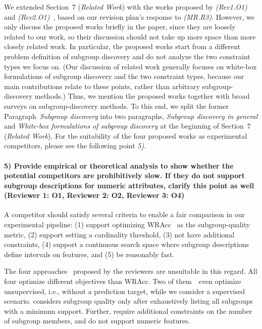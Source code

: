 \documentclass{article}
\begin{document}
We extended Section~7 (\emph{Related Work}) with the works proposed by \emph{(Rev1.O1)}~\cite{lawless2022interpretable, pastor2021looking} and \emph{(Rev2.O1)}~\cite{asudeh2019assessing, sagadeeva2021sliceline}, based on our revision plan's response to \emph{(MR.R3)}.
However, we only discuss the proposed works briefly in the paper, since they are loosely related to our work, so their discussion should not take up more space than more closely related work.
In particular, the proposed works start from a different problem definition of subgroup discovery and do not analyze the two constraint types we focus on.
(Our discussion of related work generally focuses on white-box formulations of subgroup discovery and the two constraint types, because our main contributions relate to these points, rather than arbitrary subgroup-discovery methods.)
Thus, we mention the proposed works together with broad surveys on subgroup-discovery methods.
To this end, we split the former Paragraph~\emph{Subgroup discovery} into two paragraphs, \emph{Subgroup discovery in general} and \emph{White-box formulations of subgroup discovery} at the beginning of Section~7 (\emph{Related Work}).
For the suitability of the four proposed works as experimental competitors, please see the following point \emph{5)}.

\pagebreak

\paragraph{5) Provide empirical or theoretical analysis to show whether the potential competitors are prohibitively slow. If they do not support subgroup descriptions for numeric attributes, clarify this point as well (Reviewer 1: O1, Reviewer 2: O2, Reviewer 3: O4)}

A competitor should satisfy several criteria to enable a fair comparison in our experimental pipeline:
(1) support optimizing WRAcc~\cite{lavravc1999rule} as the subgroup-quality metric,
(2) support setting a cardinality threshold,
(3) not have additional constraints,
(4) support a continuous search space where subgroup descriptions define intervals on features, and
(5) be reasonably fast.

The four approaches~\cite{asudeh2019assessing, lawless2022interpretable, pastor2021looking, sagadeeva2021sliceline} proposed by the reviewers are unsuitable in this regard.
All four optimize different objectives than WRAcc.
Two of them~\cite{asudeh2019assessing, lawless2022interpretable}~even optimize unsupervised, i.e., without a prediction target, while we consider a supervised scenario.
\cite{pastor2021looking} considers subgroup quality only after exhaustively listing all subgroups with a minimum support.
Further, \cite{asudeh2019assessing, pastor2021looking} require additional constraints on the number of subgroup members, and \cite{asudeh2019assessing, pastor2021looking, sagadeeva2021sliceline} do not support numeric features.
\end{document}
